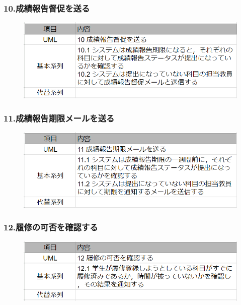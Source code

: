\documentclass[documentclass]{jsarticle}
\begin{document}
\subsubsection*{10.成績報告督促を送る}
\begin{figure}[H]
  \includegraphics*[scale=0.4]{figure/4-10.png}
\end{figure}

\subsubsection*{11.成績報告期限メールを送る}
\begin{figure}[H]
  \includegraphics*[scale=0.4]{figure/4-11.png}
\end{figure}

\subsubsection*{12.履修の可否を確認する}
\begin{figure}[H]
  \includegraphics*[scale=0.4]{figure/4-12.png}
\end{figure}

\newpage
\end{document}
